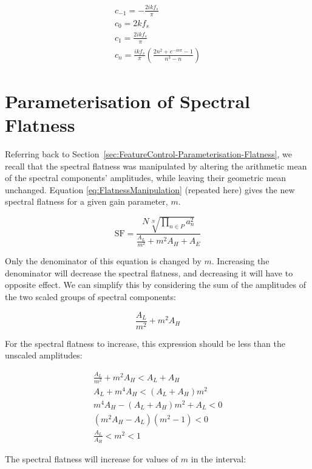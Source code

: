 \begin{appendices}
		\begin{gather}
			c_{-1} = - \frac{2ikf_{s}}{\pi} \nonumber \\[0.6em]
			c_{0} = 2kf_{s} \nonumber \\[0.6em]
			c_{1} = \frac{2ikf_{s}}{\pi} \nonumber \\[0.6em]
			c_{n} = \frac{ikf_{s}}{\pi} \left( \frac{2n^{2} + e^{-in\pi} - 1}{n^{3} - n} \right) \nonumber
		\end{gather}

	\section{Parameterisation of Spectral Flatness}
	\label{app:MathematicalDerivations-SpectralFlatness}
		Referring back to Section~\ref{sec:FeatureControl-Parameterisation-Flatness}, we recall that the spectral
		flatness was manipulated by altering the arithmetic mean of the spectral components' amplitudes, while
		leaving their geometric mean unchanged.	Equation \ref{eq:FlatnessManipulation} (repeated here) gives the new
		spectral flatness for a given gain parameter, $m$.

		\[ \mathrm{SF} = \frac{N\sqrt[N]{\prod_{n \in P} a_{n}^{2}}}
					   {\frac{A_{L}}{m^{2}} + m^{2}A_{H} + A_{E}} \]

		Only the denominator of this equation is changed by $m$. Increasing the denominator will decrease the
		spectral flatness, and decreasing it will have to opposite effect. We can simplify this by considering the
		sum of the amplitudes of the two scaled groups of spectral components:

		\[ \frac{A_{L}}{m^{2}} + m^{2}A_{H} \]

		For the spectral flatness to increase, this expression should be less than the unscaled amplitudes:

		\begin{gather}
			\frac{A_{L}}{m^{2}} + m^{2}A_{H} < A_{L} + A_{H} \nonumber \\[0.6em]
			A_{L} + m^{4}A_{H} < (A_{L} + A_{H})m^{2} \nonumber \\[0.6em]
			m^{4}A_{H} - (A_{L} + A_{H})m^{2} + A_{L} < 0 \nonumber \\[0.6em]
			(m^{2}A_{H} - A_{L})(m^{2} - 1) < 0 \nonumber \\[0.6em]
			\frac{A_{L}}{A_{H}} < m^{2} < 1 \nonumber
		\end{gather}

		The spectral flatness will increase for values of $m$ in the interval:


\end{appendices}
